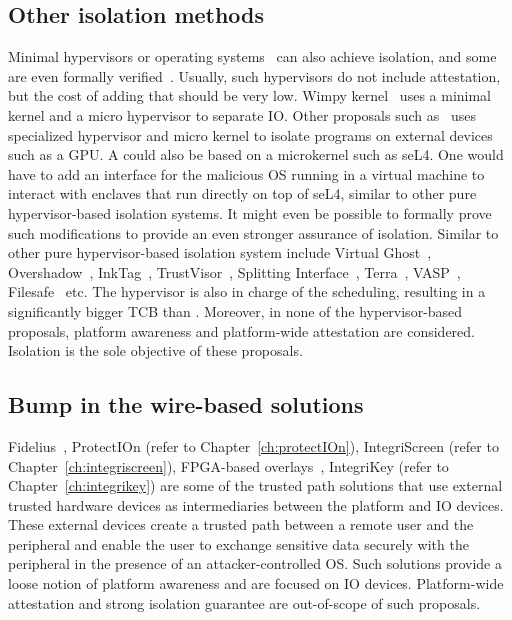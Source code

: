 \subsection{Other isolation methods} 

Minimal hypervisors or operating systems~\cite{herder2006minix,klein2009sel4} can also achieve isolation, and some are even formally verified~\cite{klein2009sel4}. Usually, such hypervisors do not include attestation, but the cost of adding that should be very low. 
Wimpy kernel~\cite{wimpyKernel} uses a minimal kernel and a micro hypervisor to separate IO. Other proposals such as~\cite{5695613,iosep, 10.1145/2493123.2462914} uses specialized hypervisor and micro kernel to isolate programs on external devices such as a GPU. A \name{} could also be based on a microkernel such as seL4. One would have to add an interface for the malicious OS running in a virtual machine to interact with enclaves that run directly on top of seL4, similar to other pure hypervisor-based isolation systems. It might even be possible to formally prove such modifications to provide an even stronger assurance of isolation. Similar to other pure hypervisor-based isolation system include Virtual Ghost~\cite{criswell2014virtual}, Overshadow~\cite{Overshadow}, InkTag~\cite{hofmann2013inktag}, TrustVisor~\cite{mccune2010trustvisor}, Splitting Interface~\cite{ta2006splitting}, Terra~\cite{garfinkel2003terra}, VASP~\cite{10.1145/1982185.1982305}, Filesafe~\cite{10.1145/2245276.2232063} etc.  The hypervisor is also in charge of the scheduling, resulting in a significantly bigger TCB than \name. Moreover, in none of the hypervisor-based proposals, platform awareness and platform-wide attestation are considered. Isolation is the sole objective of these proposals.

\subsection{Bump in the wire-based solutions} 

Fidelius~\cite{Fidelius}, ProtectIOn (refer to Chapter~\ref{ch:protectIOn}), IntegriScreen (refer to Chapter~\ref{ch:integriscreen}), FPGA-based overlays~\cite{brandon2017trusted}, IntegriKey (refer to Chapter~\ref{ch:integrikey}) are some of the trusted path solutions that use external trusted hardware devices as intermediaries between the platform and IO devices. These external devices create a trusted path between a remote user and the peripheral and enable the user to exchange sensitive data securely with the peripheral in the presence of an attacker-controlled OS. Such solutions provide a loose notion of platform awareness and are focused on IO devices. Platform-wide attestation and strong isolation guarantee are out-of-scope of such proposals. 



%     

